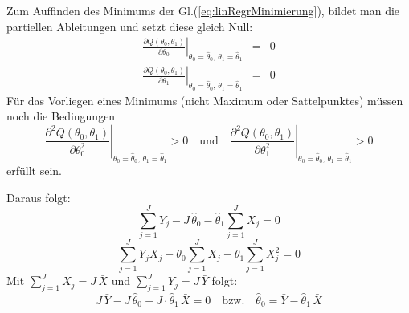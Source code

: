 Zum Auffinden des Minimums der Gl.(\ref{eq:linRegrMinimierung}), bildet man die
partiellen Ableitungen und setzt diese gleich Null:
\begin{equation}
\renewcommand*{\arraystretch}{1.5}
\begin{array}{lcc}
\left. {\frac{\partial Q(\theta _0 ,\theta _1 )}{\partial \theta_0 }} 
\right|_{\theta _0 = \hat{\theta}_0 ,\,\theta _1 = \hat{\theta}_1 } & = & 0  \\
\left. {\frac{\partial Q(\theta _0 ,\theta _1 )}{\partial \theta_1 }} 
\right|_{\theta _0 = \hat{\theta}_0 ,\,\theta _1 = \hat{\theta}_1 } & = & 0 
\end{array}
\label{GleichungssytemKostenfkt}
\end{equation}
Für das Vorliegen eines Minimums (nicht Maximum oder Sattelpunktes) müssen noch 
die Bedingungen
\begin{equation}
	\left. {\frac{\partial^2 Q(\theta _0 ,\theta _1 )}{\partial \theta_0^2 }} 
\right|_{\theta _0 = \hat{\theta}_0 ,\,\theta _1 = \hat{\theta}_1 } > 0 \quad 
\mathrm{und} \quad \left. { \frac{\partial^2 Q(\theta _0 ,\theta _1)}{ \partial \theta_1^2 }} 
\right|_{\theta _0 = \hat{\theta}_0 ,\,\theta _1 = \hat{\theta}_1 } > 0
\end{equation}
erfüllt sein.

Daraus folgt:
\[
\sum\limits_{j = 1}^J {Y_j - J} \, \hat{\theta}_0 - \hat{\theta}_1 \sum\limits_{j = 1}^J {X_j = 0}
\]
\[
\sum\limits_{j = 1}^J {Y_j X_j - \theta_0 \sum\limits_{j = 1}^J {X_j - \theta_1 \sum\limits_{j = 1}^J {X_j ^2 = 0} } }
\]
Mit $\sum\limits_{j = 1}^J {X_j } = J \, \bar {X}$ und 
$\sum\limits_{j= 1}^J {Y_j } = J \, \bar {Y}$ folgt:
\[
J \, \bar {Y} - J \, \hat{\theta}_0 - J \cdot \hat{\theta}_1 \, \bar {X} = 0 \quad
\mathrm{bzw.}\quad \hat{\theta}_0 = \bar {Y} - \hat{\theta}_1 \, \bar {X}
\]


